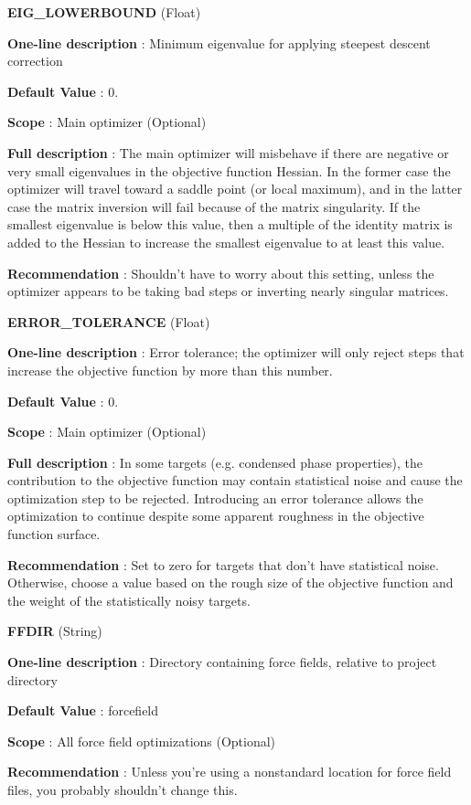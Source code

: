 \begin{DoxyItemize}
\item {\bfseries  E\-I\-G\-\_\-\-L\-O\-W\-E\-R\-B\-O\-U\-N\-D } (Float) \par
{\bfseries  One-\/line description }\-: Minimum eigenvalue for applying steepest descent correction \par
{\bfseries  Default Value }\-: 0. \par
{\bfseries  Scope }\-: Main optimizer (Optional) \par
{\bfseries  Full description }\-: The main optimizer will misbehave if there are negative or very small eigenvalues in the objective function Hessian. In the former case the optimizer will travel toward a saddle point (or local maximum), and in the latter case the matrix inversion will fail because of the matrix singularity. If the smallest eigenvalue is below this value, then a multiple of the identity matrix is added to the Hessian to increase the smallest eigenvalue to at least this value. \par
{\bfseries  Recommendation }\-: Shouldn't have to worry about this setting, unless the optimizer appears to be taking bad steps or inverting nearly singular matrices.\end{DoxyItemize}
\begin{DoxyItemize}
\item {\bfseries  E\-R\-R\-O\-R\-\_\-\-T\-O\-L\-E\-R\-A\-N\-C\-E } (Float) \par
{\bfseries  One-\/line description }\-: Error tolerance; the optimizer will only reject steps that increase the objective function by more than this number. \par
{\bfseries  Default Value }\-: 0. \par
{\bfseries  Scope }\-: Main optimizer (Optional) \par
{\bfseries  Full description }\-: In some targets (e.\-g. condensed phase properties), the contribution to the objective function may contain statistical noise and cause the optimization step to be rejected. Introducing an error tolerance allows the optimization to continue despite some apparent roughness in the objective function surface. \par
{\bfseries  Recommendation }\-: Set to zero for targets that don't have statistical noise. Otherwise, choose a value based on the rough size of the objective function and the weight of the statistically noisy targets.\end{DoxyItemize}
\begin{DoxyItemize}
\item {\bfseries  F\-F\-D\-I\-R } (String) \par
{\bfseries  One-\/line description }\-: Directory containing force fields, relative to project directory \par
{\bfseries  Default Value }\-: forcefield \par
{\bfseries  Scope }\-: All force field optimizations (Optional) \par
{\bfseries  Recommendation }\-: Unless you're using a nonstandard location for force field files, you probably shouldn't change this.\end{DoxyItemize}
